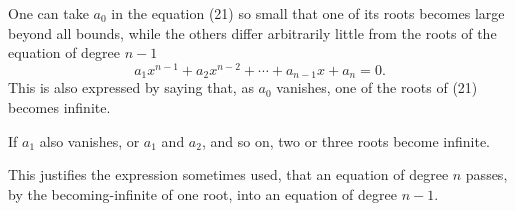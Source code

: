 \documentclass[11pt]{article}
\begin{document}
One can take $a_0$ in the equation (21) so small that one of its roots becomes large beyond all bounds, while the others differ arbitrarily little from the roots of the equation of degree $n-1$
\[
 a_1x^{n-1}+a_2x^{n-2}+\cdots+a_{n-1}x+a_n=0.
\]
This is also expressed by saying that, as $a_0$ vanishes, one of the roots of (21) becomes infinite.

If $a_1$ also vanishes, or $a_1$ and $a_2$, and so on, two or three roots become infinite.

This justifies the expression sometimes used, that an equation of degree $n$ passes, by the becoming-infinite of one root, into an equation of degree $n-1$.
\end{document}
